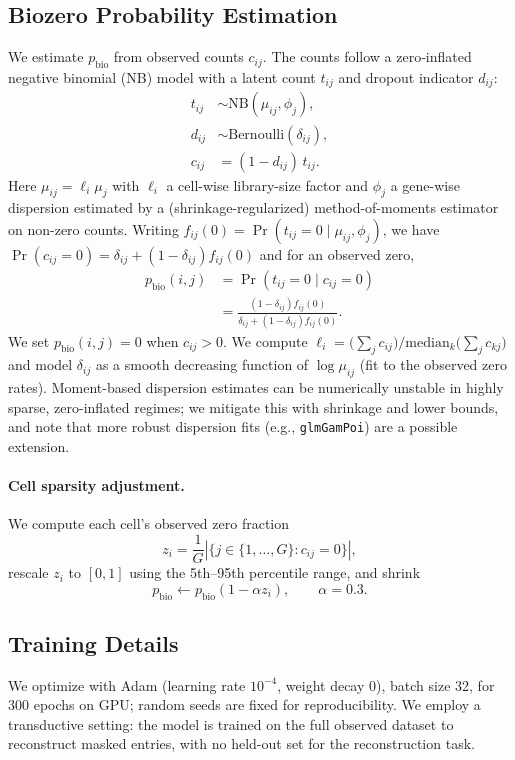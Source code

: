 \documentclass{article}
\theoremstyle{plain}
\theoremstyle{definition}
\theoremstyle{remark}
\begin{document}
\subsection{Biozero Probability Estimation}
\label{sec:biozero}
We estimate $p_{\mathrm{bio}}$ from observed counts $c_{ij}$. The counts follow a zero‑inflated
negative binomial (NB) model with a latent count $t_{ij}$ and dropout indicator
$d_{ij}$:
\[
\begin{aligned}
t_{ij} &\sim \mathrm{NB}(\mu_{ij},\phi_j),\\
d_{ij} &\sim\mathrm{Bernoulli}(\delta_{ij}),\\
c_{ij} &=(1-d_{ij})\,t_{ij}.
\end{aligned}
\]
Here $\mu_{ij}=\ell_i\mu_j$ with $\ell_i$ a cell-wise library-size factor and
$\phi_j$ a gene-wise dispersion estimated by a (shrinkage-regularized)
method-of-moments estimator on non-zero counts. Writing
$f_{ij}(0)=\Pr(t_{ij}=0\mid \mu_{ij},\phi_j)$, we have
$\Pr(c_{ij}=0)=\delta_{ij}+(1-\delta_{ij})f_{ij}(0)$ and for an observed zero,
\[
\begin{aligned}
p_{\mathrm{bio}}(i,j)
&=\Pr(t_{ij}=0\mid c_{ij}=0)\\
&=\frac{(1-\delta_{ij})f_{ij}(0)}{\delta_{ij}+(1-\delta_{ij})f_{ij}(0)}.
\end{aligned}
\]
We set $p_{\mathrm{bio}}(i,j)=0$ when $c_{ij}>0$. We compute
$\ell_i=\big(\sum_j c_{ij}\big)\big/\mathrm{median}_k\big(\sum_j c_{kj}\big)$
and model $\delta_{ij}$ as a smooth decreasing function of $\log \mu_{ij}$
(fit to the observed zero rates).
Moment-based dispersion estimates can be numerically unstable in highly sparse,
zero-inflated regimes; we mitigate this with shrinkage and lower bounds, and
note that more robust dispersion fits (e.g., \texttt{glmGamPoi}) are a possible
extension.

\paragraph{Cell sparsity adjustment.}
We compute each cell’s observed zero fraction
\[
z_i=\frac{1}{G}\left|\{j\in\{1,\dots,G\}: c_{ij}=0\}\right|,
\]
rescale $z_i$ to $[0,1]$ using the 5th–95th percentile range, and shrink
\[
p_{\mathrm{bio}} \leftarrow p_{\mathrm{bio}}(1-\alpha z_i),\qquad \alpha=0.3.
\]

\subsection{Training Details}
We optimize with Adam (learning rate $10^{-4}$, weight decay 0), batch size 32,
for 300 epochs on GPU; random seeds are fixed for reproducibility. We employ a
transductive setting: the model is trained on the full observed dataset to
reconstruct masked entries, with no held-out set for the reconstruction task.
\end{document}
